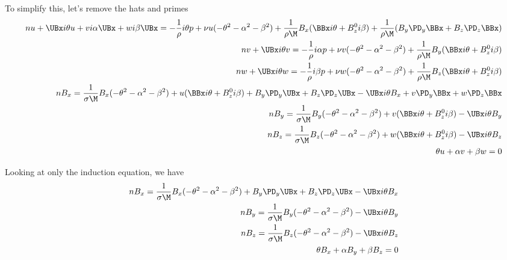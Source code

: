 \documentclass[11pt]{article}
\begin{document}
To simplify this, let's remove the hats and primes
\begin{equation}\begin{aligned}
n u+ \UBx i\theta u + v i \alpha \UBx + w i \beta \UBx = -\frac{1}{\rho} i \theta p+ \nu u (-\theta^2 -\alpha^2 - \beta^2) + \frac{1}{\rho \M} B_x (\BBx i\theta + B_z^0 i\beta) + \frac{1}{\rho \M} (B_y \PD_y \BBx + B_z \PD_z \BBx) \\
n v+ \UBx i\theta v                                    = -\frac{1}{\rho} i \alpha p+ \nu v (-\theta^2 -\alpha^2 - \beta^2) + \frac{1}{\rho \M} B_y (\BBx i\theta + B_z^0 i\beta) \\
n w+ \UBx i\theta w                                    = -\frac{1}{\rho} i \beta  p+ \nu w (-\theta^2 -\alpha^2 - \beta^2) + \frac{1}{\rho \M} B_z (\BBx i\theta + B_z^0 i\beta) \\
n B_x = \frac{1}{\sigma \M} B_x (-\theta^2 -\alpha^2 -\beta^2) + u (\BBx i\theta +B_z^0 i\beta) +B_y \PD_y \UBx +B_z \PD_z \UBx - \UBx i\theta B_x + v \PD_y \BBx +w \PD_z \BBx \\
n B_y = \frac{1}{\sigma \M} B_y (-\theta^2 -\alpha^2 -\beta^2) + v (\BBx i\theta +B_z^0 i\beta)                                 - \UBx i\theta B_y                                         \\
n B_z = \frac{1}{\sigma \M} B_z (-\theta^2 -\alpha^2 -\beta^2) + w (\BBx i\theta +B_z^0 i\beta)                                 - \UBx i\theta B_z                                         \\
\theta u +  \alpha v +  \beta w = 0 \\
\end{aligned} \end{equation}

Looking at only the induction equation, we have
\begin{equation}\begin{aligned}
n B_x = \frac{1}{\sigma \M} B_x (-\theta^2 -\alpha^2 -\beta^2) +B_y \PD_y \UBx +B_z \PD_z \UBx - \UBx i\theta B_x \\
n B_y = \frac{1}{\sigma \M} B_y (-\theta^2 -\alpha^2 -\beta^2)                                 - \UBx i\theta B_y \\
n B_z = \frac{1}{\sigma \M} B_z (-\theta^2 -\alpha^2 -\beta^2)                                 - \UBx i\theta B_z \\
\theta B_x +  \alpha B_y +  \beta B_z = 0 \\
\end{aligned} \end{equation}
\end{document}

